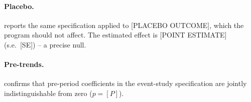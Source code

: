 

\paragraph{Placebo.}  reports the same specification
applied to [PLACEBO OUTCOME], which the program should not affect.
The estimated effect is [POINT ESTIMATE] (s.e.\ [SE]) -- a precise
null.



\paragraph{Pre-trends.}  confirms that pre-period
coefficients in the event-study specification are jointly
indistinguishable from zero ($p = [P]$).
